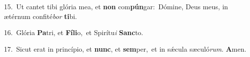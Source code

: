 {\numbfont\textcolor{\numbcolor}{15.}}~Ut cantet tibi glória mea, et \textbf{non} com\-\textbf{pún}\-gar:~\star Dómine, Deus meus, in ætérnum confité\textit{bor} \textbf{ti}\-bi.\par
{\numbfont\textcolor{\numbcolor}{16.}}~Glória \textbf{Pa}\-tri, et \textbf{Fí}\-\textbf{li}o,~\star et Spirítu\textit{i} \textbf{Sanc}\-to.\par
{\numbfont\textcolor{\numbcolor}{17.}}~Sicut erat in princípio, et \textbf{nunc}\-, et \textbf{sem}\-per,~\star et in sǽcula sæculó\-\textit{rum}\-. \textbf{A}\-men.\par
